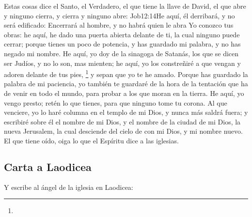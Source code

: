 Estas cosas dice el Santo, el Verdadero, el que tiene la llave de David, el que abre y ninguno cierra, y cierra y ninguno abre:%
				{Job}{12:14}{He aquí, él derribará, y no será edificado: Encerrará al hombre, y no habrá quien le abra}
Yo conozco tus obras: he aquí, he dado una puerta abierta delante de ti, la cual ninguno puede cerrar; porque tienes un poco de potencia, y has guardado mi palabra, y no has negado mi nombre. %
He aquí, yo doy de la sinagoga de Satanás, los que se dicen ser Judíos, y no lo son, mas mienten; he aquí, yo los constreñiré a que vengan y adoren delante de tus pies,%
	\footnote{ %
				}
 y sepan que yo te he amado. %
Porque has guardado la palabra de mi paciencia, yo también te guardaré de la hora de la tentación que ha de venir en todo el mundo, para probar a los que moran en la tierra. %
He aquí, yo vengo presto; retén lo que tienes, para que ninguno tome tu corona. %
Al que venciere, yo lo haré columna en el templo de mi Dios, y nunca más saldrá fuera; y escribiré sobre él el nombre de mi Dios, y el nombre de la ciudad de mi Dios,%
 la nueva Jerusalem, la cual desciende del cielo de con mi Dios, y mi nombre nuevo. %
El que tiene oído, oiga lo que el Espíritu dice a las iglesias.
\subsection*{Carta a Laodicea}
Y escribe al ángel de la iglesia en Laodicea:

